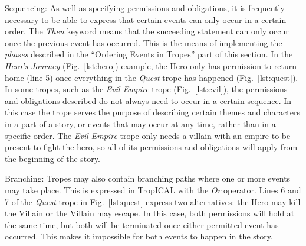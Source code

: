 \begin{compactdesc}
\item[Sequencing:]
As well as specifying permissions and obligations, it is frequently necessary to be able to express that certain events can only occur in a certain order. The \emph{Then} keyword means that the succeeding statement can only occur once the previous event has occurred. This is the means of implementing the \emph{phases} described in the ``Ordering Events in Tropes'' part of this section. In the \emph{Hero's Journey} (Fig.~\ref{lst:hero}) example, the Hero only has permission to return home (line 5) once everything in the \emph{Quest} trope has happened (Fig.~\ref{lst:quest}).
In some tropes, such as the \emph{Evil Empire} trope (Fig.~\ref{lst:evil}), the permissions and obligations described do not always need to occur in a certain sequence. In this case the trope serves the purpose of describing certain themes and characters in a part of a story, or events that may occur at any time, rather than in a specific order. The \emph{Evil Empire} trope only needs a villain with an empire to be present to fight the hero, so all of its permissions and obligations will apply from the beginning of the story.

\item[Branching:]
Tropes may also contain branching paths where one or more events may take place. This is expressed in TropICAL with the \emph{Or} operator. Lines 6 and 7 of the \emph{Quest} trope in Fig.~\ref{lst:quest} express two alternatives: the Hero may kill the Villain or the Villain may escape. In this case, both permissions will hold at the same time, but both will be terminated once either permitted event has occurred. This makes it impossible for both events to happen in the story.


\end{compactdesc}

